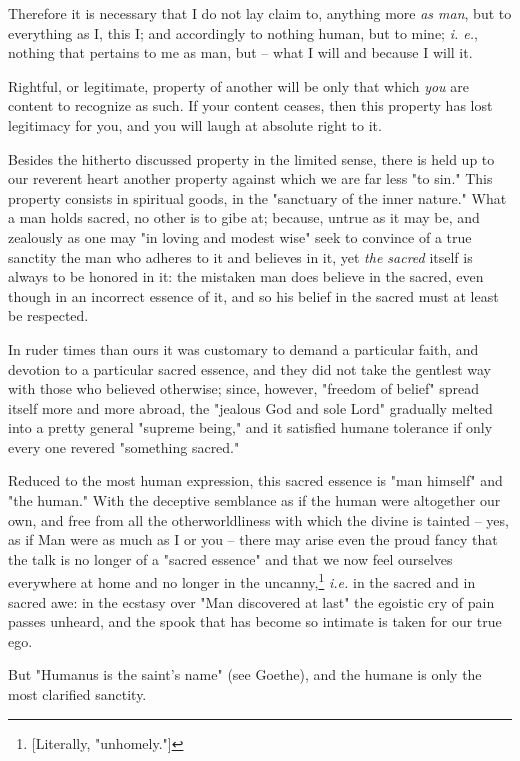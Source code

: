 Therefore it is necessary that I do not lay claim to, anything more \textit{as 
man}, but to everything as I, this I; and accordingly to nothing human, but to 
mine; \textit{i. e.}, nothing that pertains to me as man, but -- what I will 
and because I will it.

Rightful, or legitimate, property of another will be only that which 
\textit{you} are content to recognize as such. If your content ceases, then 
this property has lost legitimacy for you, and you will laugh at absolute 
right to it.

Besides the hitherto discussed property in the limited sense, there is held up 
to our reverent heart another property against which we are far less "{}to 
sin."{} This property consists in spiritual goods, in the "{}sanctuary of the 
inner nature."{} What a man holds sacred, no other is to gibe at; because, 
untrue as it may be, and zealously as one may "{}in loving and modest wise"{} 
seek to convince of a true sanctity the man who adheres to it and believes in 
it, yet \textit{the sacred} itself is always to be honored in it: the mistaken 
man does believe in the sacred, even though in an incorrect essence of it, and 
so his belief in the sacred must at least be respected.

In ruder times than ours it was customary to demand a particular faith, and 
devotion to a particular sacred essence, and they did not take the gentlest 
way with those who believed otherwise; since, however, "{}freedom of belief"{} 
spread itself more and more abroad, the "{}jealous God and sole Lord"{} 
gradually melted into a pretty general "{}supreme being,"{} and it satisfied 
humane tolerance if only every one revered "{}something sacred."{}

Reduced to the most human expression, this sacred essence is "{}man himself"{} 
and "{}the human."{} With the deceptive semblance as if the human were 
altogether our own, and free from all the otherworldliness with which the 
divine is tainted -- yes, as if Man were as much as I or you -- there may 
arise even the proud fancy that the talk is no longer of a "{}sacred 
essence"{} and that we now feel ourselves everywhere at home and no longer in 
the uncanny,\footnote{[Literally, "{}unhomely."{}]} \textit{i.e.} in the 
sacred and in sacred awe: in the ecstasy over "{}Man discovered at last"{} the 
egoistic cry of pain passes unheard, and the spook that has become so intimate 
is taken for our true ego.

But "{}Humanus is the saint's name"{} (see Goethe), and the humane is only the 
most clarified sanctity.

